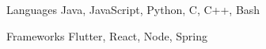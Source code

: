 
\begin{cvskills}
  \cvskill
    {Languages} %
    {Java, JavaScript, Python, C, C++, Bash} %

  \cvskill
    {Frameworks} %
    {Flutter, React, Node, Spring} %
\end{cvskills}
